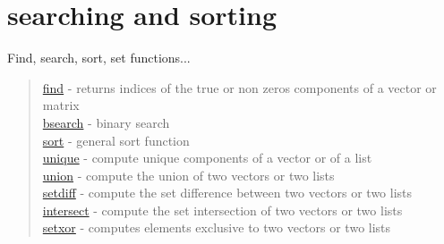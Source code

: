 \chapter*{searching and sorting}

Find, search, sort, set functions...

\begin{quote}
\noindent
\hyperlink{find}{find} - returns indices of the true or non zeros
components of a vector or matrix \\
\hyperlink{bsearch}{bsearch} - binary search \\
\hyperlink{sort}{sort} - general sort function \\
\hyperlink{unique}{unique} - compute unique components of a vector or of a list \\
\hyperlink{union}{union} - compute the union of two vectors or two lists \\
\hyperlink{setdiff}{setdiff} - compute the set difference between two vectors or two lists\\
\hyperlink{intersect}{intersect} - compute the set intersection of two vectors or two lists\\
\hyperlink{setxor}{setxor} - computes elements exclusive to two vectors or two lists\\
\end{quote}

 
 
 

 
 
  
 
